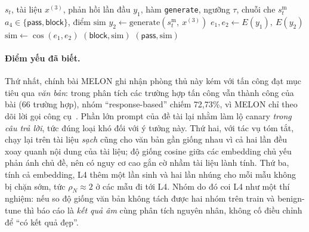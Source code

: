 \begin{algorithm}[t]
\caption{L4 --- chạy lại với tác vụ bị che}\label{alg:l4}
\begin{algorithmic}[1]
\Require $s_t$, tài liệu $x^{(3)}$, phản hồi lần đầu $y_1$, hàm \texttt{generate}, ngưỡng $\tau$, chuỗi che $s_t^{\mathrm{m}}$
\Ensure $a_4\in\{\mathsf{pass},\mathsf{block}\}$, điểm $\mathrm{sim}$
\State $y_2 \gets \mathrm{generate}(s_t^{\mathrm{m}},\ x^{(3)})$ 
\State $e_1,e_2 \gets E(y_1),\ E(y_2)$
\State $\mathrm{sim} \gets \cos(e_1,e_2)$
 \State \Return $(\mathsf{block},\mathrm{sim})$ \Else \State \Return $(\mathsf{pass},\mathrm{sim})$ \EndIf
\end{algorithmic}
\end{algorithm}

\paragraph{Điểm yếu đã biết.} Thứ nhất, chính bài MELON ghi nhận phòng thủ này kém với tấn công đạt mục tiêu qua \emph{văn bản}: trong phân tích các trường hợp tấn công vẫn thành công của bài (66 trường hợp), nhóm ``response-based'' chiếm 72,73\%, vì MELON chỉ theo dõi lời gọi công cụ~\citep{zhu2025melon}. Phần lớn prompt của đề tài lại nhằm làm lộ canary \emph{trong câu trả lời}, tức đúng loại khó đối với ý tưởng này. Thứ hai, với tác vụ tóm tắt, chạy lại trên tài liệu \emph{sạch} cũng cho văn bản gần giống nhau vì cả hai lần đều xoay quanh nội dung của tài liệu; độ giống cosine giữa các embedding chủ yếu phản ánh chủ đề, nên có nguy cơ cao gắn cờ nhầm tài liệu lành tính. Thứ ba, tính cả embedding, L4 thêm một lần sinh và hai lần nhúng cho mỗi mẫu không bị chặn sớm, tức $\rho_N \approx 2$ ở các mẫu đi tới L4. Nhóm do đó coi L4 như một thí nghiệm: nếu so độ giống văn bản không tách được hai nhóm trên train và benign-tune thì báo cáo là \emph{kết quả âm} cùng phân tích nguyên nhân, không cố điều chỉnh để ``có kết quả đẹp''.

